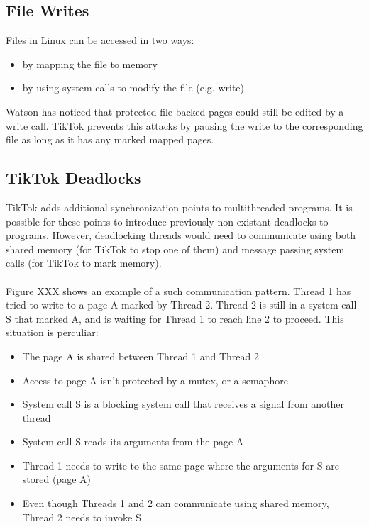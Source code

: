 \documentclass[conference]{IEEEtran}
\begin{document}
\subsection{File Writes}
\label{sec:filewrites}
Files in Linux can be accessed in two ways:
\begin{itemize}
    \item by mapping the file to memory
    \item by using system calls to modify the file (e.g. write)
\end{itemize}

Watson has noticed that protected file-backed pages could still be edited by a write call. TikTok prevents this attacks
by pausing the write to the corresponding file as long as it has any marked mapped pages.

\subsection{TikTok Deadlocks}

TikTok adds additional synchronization points to multithreaded programs. It is possible for these points to introduce 
previously non-existant deadlocks to programs. However, deadlocking threads would need to communicate using both 
shared memory (for TikTok to stop one of them) and message passing system calls (for TikTok to mark memory).
\\
\\
Figure XXX shows an example of a such communication pattern. Thread 1 has tried to write to a page A marked by Thread 2. 
Thread 2 is still in a system call S that marked A, and is waiting for Thread 1 to reach line 2 to proceed. This situation is
perculiar:
\begin{itemize}
    \item The page A is shared between Thread 1 and Thread 2
    \item Access to page A isn't protected by a mutex, or a semaphore
    \item System call S is a blocking system call that receives a signal from another thread
    \item System call S reads its arguments from the page A
    \item Thread 1 needs to write to the same page where the arguments for S are stored (page A)
    \item Even though Threads 1 and 2 can communicate using shared memory, Thread 2 needs to invoke S
\end{itemize}
\end{document}
